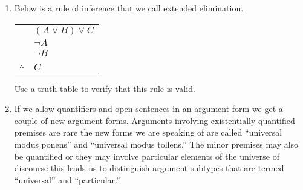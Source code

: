 \documentclass[10pt,]{book}
\theoremstyle{plain}
\theoremstyle{definition}
\theoremstyle{definition}
\numberwithin{equation}{section}
\newcommand{\hrulethin}  {\noalign{\hrule height 0.04em}}
\newcommand{\hint}[1]{ }
\begin{document}
\begin{enumerate}[label=(\alph*)]
\item\hypertarget{li-213}{}
        Below is a rule of inference that we call extended elimination.
        \begin{tabular}{ll}
&\((A \lor B) \lor C\)\tabularnewline[0pt]
&\({\lnot}A\)\tabularnewline[0pt]
&\({\lnot}B\)\tabularnewline[0pt]
&\tabularnewline\hrulethin
\(\therefore\)&\(C\)
\end{tabular}

        Use a truth table to verify that this rule is valid.

        \hint{



        In the following truth table the predicate variables occupy the first 3 columns, the argument's 
        premises are in the next three columns and the conclusion is in the right-most column.  The
        truth values have already been filled-in.  You only need to identify the critical rows and 
        verify that the conclusion is true in those rows.
        \begin{tabular}{lllllll}
&&&&&&\tabularnewline\hrulethin
\(A\)&\(B\)&\(C\)&\((A \lor B) \lor C\)&\({\lnot}A\)&\({\lnot}B\)&\(C\)\tabularnewline[0pt]
&&&&&&\tabularnewline\hrulethin
\(T\)&\(T\)&\(T\)&\(T\)&\(\phi\)&\(\phi\)&\(T\)\tabularnewline[0pt]
&&&&&&\tabularnewline\hrulethin
\(T\)&\(T\)&\(\phi\)&\(T\)&\(\phi\)&\(\phi\)&\(\phi\)\tabularnewline[0pt]
&&&&&&\tabularnewline\hrulethin
\(T\)&\(\phi\)&\(T\)&\(T\)&\(\phi\)&\(T\)&\(T\)\tabularnewline[0pt]
&&&&&&\tabularnewline\hrulethin
\(T\)&\(\phi\)&\(\phi\)&\(T\)&\(\phi\)&\(T\)&\(\phi\)\tabularnewline[0pt]
&&&&&&\tabularnewline\hrulethin
\(\phi\)&\(T\)&\(T\)&\(T\)&\(T\)&\(\phi\)&\(T\)\tabularnewline[0pt]
&&&&&&\tabularnewline\hrulethin
\(\phi\)&\(T\)&\(\phi\)&\(T\)&\(T\)&\(\phi\)&\(\phi\)\tabularnewline[0pt]
&&&&&&\tabularnewline\hrulethin
\(\phi\)&\(\phi\)&\(T\)&\(T\)&\(T\)&\(T\)&\(T\)\tabularnewline[0pt]
&&&&&&\tabularnewline\hrulethin
\(\phi\)&\(\phi\)&\(\phi\)&\(\phi\)&\(T\)&\(T\)&\(\phi\)\tabularnewline[0pt]
&&&&&&\tabularnewline\hrulethin
\end{tabular}

        }
\item\hypertarget{li-214}{}
        If we allow quantifiers and open sentences in an argument form we
        get a couple of new argument forms.  Arguments involving existentially quantified 
        premises are rare \textemdash{} the new forms we are speaking of are called ``universal modus 
        ponens'' and ``universal modus tollens.''   The minor premises may also be quantified
        or they may involve particular elements of the universe of discourse \textemdash{} this leads
        us to distinguish argument subtypes that are termed ``universal'' and ``particular.''


\end{enumerate}
\end{document}
